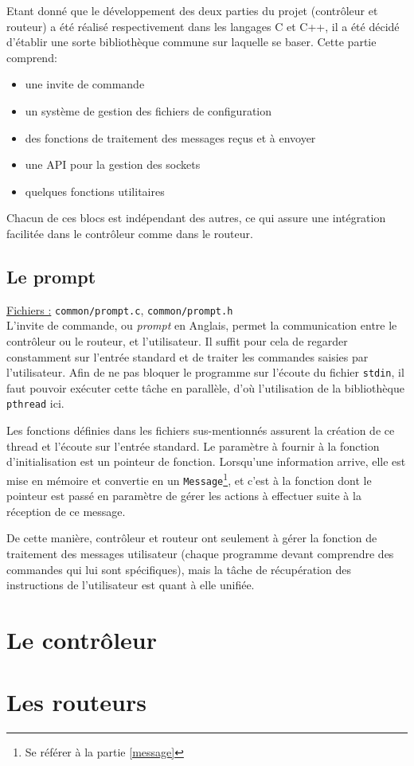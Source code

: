 \documentclass[a4paper,11pt]{article}
\begin{document}
Etant donné que le développement des deux parties du projet (contr\^oleur et routeur) a été réalisé respectivement dans les langages C et C++, il a été décidé d'établir une sorte bibliothèque commune sur laquelle se baser. Cette partie comprend:
\begin{itemize}
 \item une invite de commande
 \item un système de gestion des fichiers de configuration
 \item des fonctions de traitement des messages reçus et à envoyer
 \item une API pour la gestion des sockets
 \item quelques fonctions utilitaires
\end{itemize}

Chacun de ces blocs est indépendant des autres, ce qui assure une intégration facilitée dans le contrôleur comme dans le routeur.

\subsection{Le prompt}

\underline{Fichiers :} \texttt{common/prompt.c}, \texttt{common/prompt.h}\\

L'invite de commande, ou \textit{prompt} en Anglais, permet la communication entre le contrôleur ou le routeur, et l'utilisateur. Il suffit pour cela de regarder constamment sur l'entrée standard et de traiter les commandes saisies par l'utilisateur. Afin de ne pas bloquer le programme sur l'écoute du fichier \texttt{stdin}, il faut pouvoir exécuter cette tâche en parallèle, d'où l'utilisation de la bibliothèque \texttt{pthread} ici.

Les fonctions définies dans les fichiers sus-mentionnés assurent la création de ce thread et l'écoute sur l'entrée standard. Le paramètre à fournir à la fonction d'initialisation est un pointeur de fonction. Lorsqu'une information arrive, elle est mise en mémoire et convertie en un \texttt{Message}\footnote{Se référer à la partie \ref{message}}, et c'est à la fonction dont le pointeur est passé en paramètre de gérer les actions à effectuer suite à la réception de ce message.

De cette manière, contr\^oleur et routeur ont seulement à gérer la fonction de traitement des messages utilisateur (chaque programme devant comprendre des commandes qui lui sont spécifiques), mais la t\^ache de récupération des instructions de l'utilisateur est quant à elle unifiée.

\section{Le contrôleur}


\section{Les routeurs}
\end{document}
